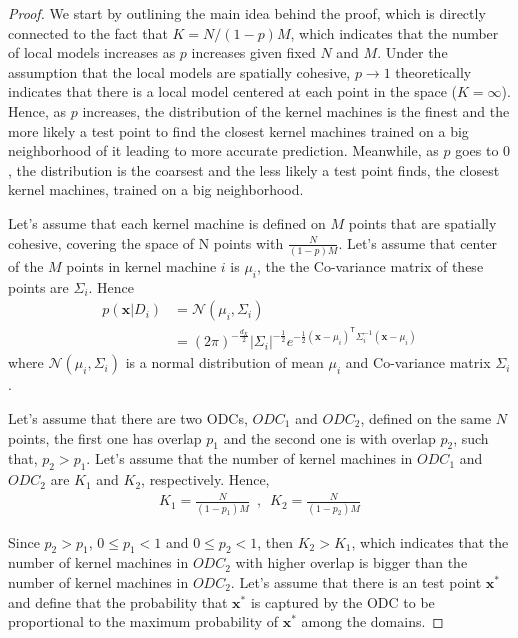\begin{proof}
We start by outlining the main idea behind  the proof, which is directly connected to the fact that $K= N/ (1-p) M$, which indicates that the number of local models increases as $p$ increases given fixed $N$ and $M$.  Under the assumption that the local models are spatially cohesive,  $p \to 1$ theoretically indicates that there is a local model  centered at each point in the space (\ie $K = \infty$). Hence, as $p$ increases, the distribution of the kernel machines is the finest and the more likely a test point to find the closest kernel machines trained on a big neighborhood of it leading to more accurate prediction. Meanwhile, as $p$ goes to $0$, the distribution is the coarsest and the less likely a test point finds, the closest kernel machines, trained on a big neighborhood. 

Let's assume that each kernel machine is defined on $M$ points that are spatially cohesive, covering the space of N points with $\frac{N}{(1-p)M}$. Let's assume that center of the $M$ points in kernel machine $i$ is $\mu_i$, the the Co-variance matrix of these points are $\Sigma_i$. Hence  
\begin{equation}
\begin{split}
p(\textbf{x}|D_i) &=  \mathcal{N}(\mu_i, \Sigma_i) \\
&=  (2 \pi)^{-\frac{d_X}{2}} |\Sigma_i|^{-\frac{1}{2}} e^{-\frac{1}{2} (\textbf{x}-\mu_i)^\mathsf{T} \Sigma_i^{-1}
 (\textbf{x}-\mu_i)}  
\end{split}
\end{equation}
where $\mathcal{N}(\mu_i, \Sigma_i)$ is a normal distribution of mean  $\mu_i$ and Co-variance matrix $\Sigma_i$. 


Let's assume that there are two ODCs, $ODC_1$ and $ODC_2$, defined on the same $N$ points, the first one has  overlap $p_1$ and the second one is with overlap $p_2$, such that, $p_2>p_1$. Let's assume that the number  of kernel machines in $ODC_1$ and $ODC_2$ are  $K_1$ and $K_2$, respectively. Hence, 
\begin{equation}
\begin{split}
K_1 = \frac{N}{(1-p_1)M}\,\,\,, \,\,\, K_2 = \frac{N}{(1-p_2)M} 
\end{split}
\end{equation}

Since $p_2>p_1$, $0\le p_1 < 1$ and $0\le p_2 < 1$,  then $K_2>K_1$, which indicates that the number of kernel machines in $ODC_2$ with higher overlap is bigger than the number of kernel machines in $ODC_2$.   Let's assume that there is an  test point $\textbf{x}^*$ and define that the probability that $\textbf{x}^*$ is captured by the ODC to be proportional to the maximum probability of $\textbf{x}^*$ among the domains. 


\end{proof}
